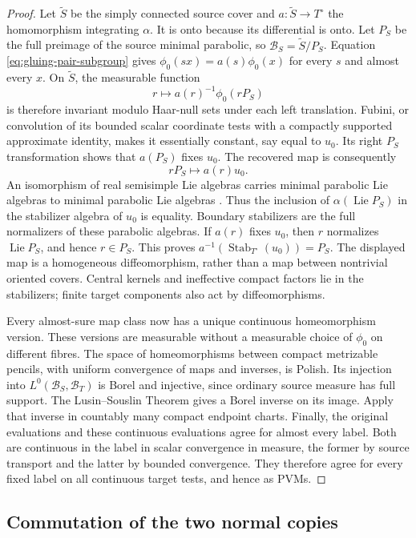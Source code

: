 \begin{proof}
Let $\widetilde S$ be the simply connected source cover and
$a:\widetilde S\to T^\circ$ the homomorphism integrating
$\alpha$.  It is onto because its differential is onto.
Let $P_S$ be the full preimage of the source minimal
parabolic, so $\mathcal B_S=\widetilde S/P_S$.  Equation
\eqref{eq:gluing-pair-subgroup} gives
$\phi_0(sx)=a(s)\phi_0(x)$ for every $s$ and almost every $x$.
On $\widetilde S$, the measurable function
\[
 r\longmapsto a(r)^{-1}\phi_0(rP_S)
\]
is therefore invariant modulo Haar-null sets under each left
translation.  Fubini, or convolution of its bounded scalar
coordinate tests with a compactly supported approximate identity,
makes it essentially constant, say equal to $u_0$.
Its right $P_S$ transformation shows that $a(P_S)$ fixes $u_0$.
The recovered map is consequently
\[
 rP_S\longmapsto a(r)u_0.
\]
An isomorphism of real semisimple Lie algebras carries minimal
parabolic Lie algebras to minimal parabolic Lie algebras
\cite{Borel1991}.
Thus the inclusion of $\alpha(\operatorname{Lie}P_S)$ in the
stabilizer algebra of $u_0$ is equality.  Boundary stabilizers
are the full normalizers of these parabolic algebras.  If
$a(r)$ fixes $u_0$, then $r$ normalizes
$\operatorname{Lie}P_S$, and hence $r\in P_S$.
This proves
$a^{-1}(\operatorname{Stab}_{T^\circ}(u_0))=P_S$.
The displayed map is a homogeneous diffeomorphism, rather
than a map between nontrivial oriented covers.  Central kernels
and ineffective compact factors lie in the stabilizers;
finite target components also act by diffeomorphisms.

Every almost-sure map class now has a unique continuous
homeomorphism version.  These versions are measurable without
a measurable choice of $\phi_0$ on different fibres.
The space of homeomorphisms between compact metrizable pencils,
with uniform convergence of maps and inverses, is Polish.
Its injection into $L^0(\mathcal B_S,\mathcal B_T)$ is Borel
and injective, since ordinary source measure has full support.
The Lusin--Souslin Theorem \cite[Corollary~15.2]{Kechris1995} gives a Borel inverse on its image.
Apply that inverse in countably many compact endpoint charts.
Finally, the original evaluations and these continuous
evaluations agree for almost every label.  Both are continuous
in the label in scalar convergence in measure, the former by
source transport and the latter by bounded convergence.
They therefore agree for every fixed label on all continuous
target tests, and hence as PVMs.
\end{proof}

\subsection{Commutation of the two normal copies}

